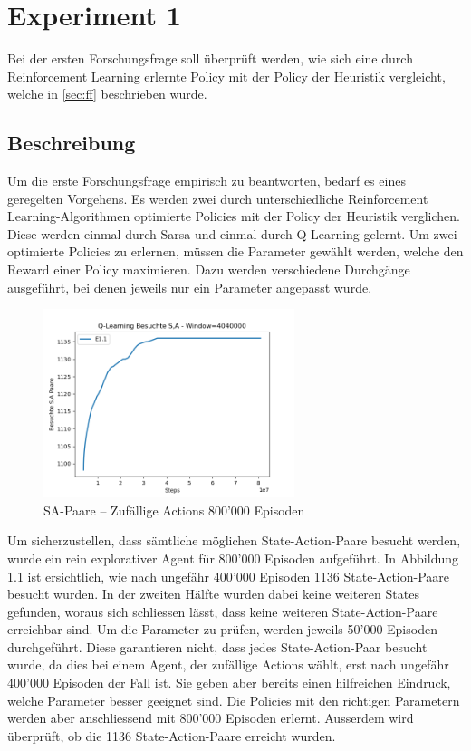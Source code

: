 \chapter{Experiment 1}
Bei der ersten Forschungsfrage soll überprüft werden, wie sich eine durch Reinforcement Learning erlernte Policy mit der Policy der Heuristik vergleicht, welche in \autoref{sec:ff} beschrieben wurde.
\section{Beschreibung}
\label{sec:exp1-desc}
Um die erste Forschungsfrage empirisch zu beantworten, bedarf es eines geregelten Vorgehens. Es werden zwei durch unterschiedliche Reinforcement Learning-Algorithmen optimierte Policies mit der Policy der Heuristik verglichen. Diese werden einmal durch Sarsa und einmal durch Q-Learning gelernt. Um zwei optimierte Policies zu erlernen, müssen die Parameter gewählt werden, welche den Reward einer Policy maximieren. Dazu werden verschiedene Durchgänge ausgeführt, bei denen jeweils nur ein Parameter angepasst wurde.
 \begin{figure}[H]
 \centering
  \includegraphics[height=5.5cm]{img/plots/exp-1/visited_800k.png}
  \caption{SA-Paare – Zufällige Actions 800'000 Episoden}
      \label{fig:visited_800k}
\end{figure}
Um sicherzustellen, dass sämtliche möglichen State-Action-Paare besucht werden, wurde ein rein explorativer Agent für 800'000 Episoden aufgeführt. In Abbildung \ref{fig:visited_800k} ist ersichtlich, wie nach ungefähr 400'000 Episoden 1136 State-Action-Paare besucht wurden. In der zweiten Hälfte wurden dabei keine weiteren States gefunden, woraus sich schliessen lässt, dass keine weiteren State-Action-Paare erreichbar sind. Um die Parameter zu prüfen, werden jeweils 50'000 Episoden durchgeführt. Diese garantieren nicht, dass jedes State-Action-Paar besucht wurde, da dies bei einem Agent, der zufällige Actions wählt, erst nach ungefähr 400'000 Episoden der Fall ist. Sie geben aber bereits einen hilfreichen Eindruck, welche Parameter besser geeignet sind. Die Policies mit den richtigen Parametern werden aber anschliessend mit 800'000 Episoden erlernt. Ausserdem wird überprüft, ob die 1136 State-Action-Paare erreicht wurden. 
